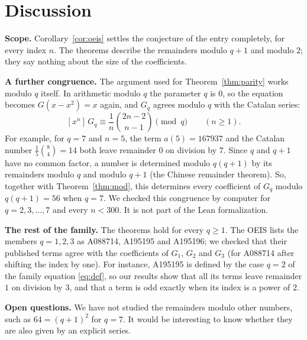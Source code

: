 \documentclass[11pt,a4paper]{article}
\theoremstyle{definition}
\theoremstyle{remark}
\newcommand{\coeff}[2]{[x^{#1}]\,#2}
\newcommand{\para}[1]{\par\medskip\noindent\textbf{#1}\enspace}
\begin{document}
\section{Discussion}\label{sec:discussion}

\para{Scope.} Corollary~\ref{cor:oeis} settles the conjecture of the entry completely,
for every index $n$. The theorems describe the remainders modulo $q+1$ and modulo $2$; they say nothing about the size
of the coefficients.

\para{A further congruence.} The argument used for Theorem~\ref{thm:parity} works modulo $q$ itself. In arithmetic
modulo $q$ the parameter $q$ is $0$, so the equation becomes $G(x-x^2)=x$ again, and $G_q$ agrees modulo $q$ with the
Catalan series:
\[
\coeff{n}{G_q}\equiv\frac{1}{n}\binom{2n-2}{n-1}\pmod q\qquad(n\ge1).
\]
For example, for $q=7$ and $n=5$, the term $a(5)=167937$ and the Catalan number $\frac15\binom84=14$ both leave remainder $0$ on division by $7$. Since $q$ and $q+1$ have no common factor, a number is determined modulo $q(q+1)$ by its
remainders modulo $q$ and modulo $q+1$ (the Chinese remainder theorem). So, together with Theorem~\ref{thm:mod}, this
determines every coefficient of $G_q$ modulo $q(q+1)=56$ when $q=7$. We checked
this congruence by computer for $q=2,3,\dots,7$ and every $n<300$. It is not part of the Lean formalization.

\para{The rest of the family.} The theorems hold for every $q\ge1$. The OEIS lists the members $q=1,2,3$ as A088714,
A195195 and A195196; we checked that their published terms agree with the coefficients of $G_1$, $G_2$ and $G_3$ (for
A088714 after shifting the index by one). For instance, A195195 is defined by the case $q=2$ of
the family equation \eqref{eq:def}, so our results show that all its terms leave remainder $1$ on division by $3$, and that a term is odd
exactly when its index is a power of $2$.

\para{Open questions.} We have not studied the remainders modulo other numbers, such as $64=(q+1)^2$
for $q=7$. It would be interesting to know whether they are also given by an explicit series.
\end{document}
